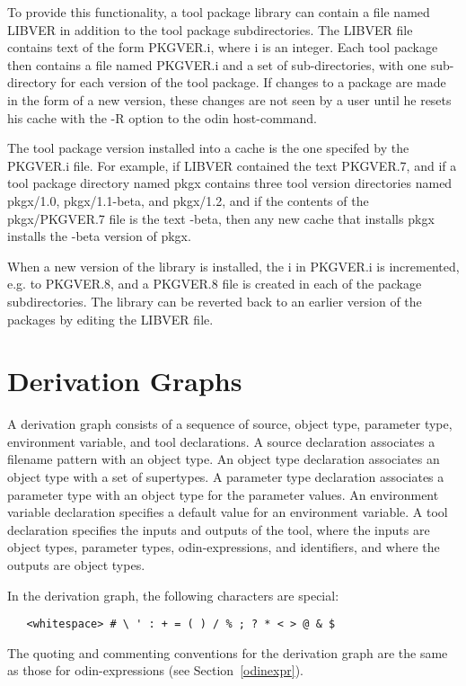 To provide this functionality,
a tool package library can contain a file named {\ex LIBVER}
in addition to the tool package subdirectories.
The {\ex LIBVER} file contains text of the form {\ex PKGVER.i},
where {\ex i} is an integer.
Each tool package then contains a file named {\ex PKGVER.i}
and a set of sub-directories,
with one sub-directory for each version of the tool package.
If changes to a package are made in the form of a new version,
these changes are not seen by a user until he resets his cache
with the {\ex -R} option to the {\ex odin} host-command.

The tool package version installed into a cache is
the one specifed by the {\ex PKGVER.i} file.
For example, if {\ex LIBVER} contained the text {\ex PKGVER.7},
and if a tool package directory named {\ex pkgx}
contains three tool version directories named {\ex pkgx/1.0},
{\ex pkgx/1.1-beta}, and {\ex pkgx/1.2},
and if the contents of the {\ex pkgx/PKGVER.7} file
is the text {-beta},
then any new cache that installs {\ex pkgx} 
installs the {-beta} version of {\ex pkgx}.

When a new version of the library is installed,
the {\ex i} in {\ex PKGVER.i} is incremented, e.g. to {\ex PKGVER.8},
and a {\ex PKGVER.8} file is created in each of the package subdirectories.
The library can be reverted back to an earlier version of the packages
by editing the {\ex LIBVER} file.


\section{Derivation Graphs}
\label{derivationgraph}

A derivation graph consists of a sequence of
source, object type, parameter type, environment variable,
and tool declarations.
A source declaration associates a filename pattern with an object type.
An object type declaration associates an object type with a set of
supertypes.
A parameter type declaration associates a parameter type with an object type
for the parameter values.
An environment variable declaration specifies a default value
for an environment variable.
A tool declaration specifies the inputs and outputs of the tool,
where the inputs are object types, parameter types, odin-expressions,
and identifiers, and where the outputs are object types.

In the derivation graph, the following characters are special:
\begin{verbatim}
   <whitespace> # \ ' : + = ( ) / % ; ? * < > @ & $
\end{verbatim}
The quoting and commenting conventions for the derivation graph are the same
as those for odin-expressions (see Section~\ref{odinexpr}).


